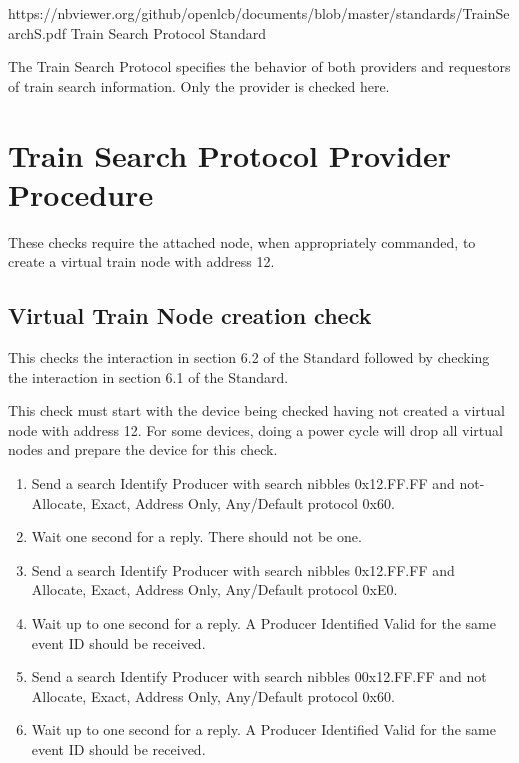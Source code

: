 



\maketitle
\thispagestyle{firststyle}

\introductionCaveats
    {https://nbviewer.org/github/openlcb/documents/blob/master/standards/TrainSearchS.pdf}
    {Train Search Protocol Standard}

The Train Search Protocol specifies the behavior of both providers and requestors of 
train search information.  Only the provider is checked here.


\section{Train Search Protocol Provider Procedure}


These checks require the attached node, when appropriately commanded,
to create a virtual train node with address 12.

\subsection{Virtual Train Node creation check}

This checks the interaction in section 6.2 of the Standard
followed by checking the interaction in section 6.1 of the Standard.

This check must start with the device being checked having not created a
virtual node with address 12. For some devices, doing a power cycle will 
drop all virtual nodes and prepare the device for this check.

\begin{enumerate}

\item Send a search Identify Producer with search nibbles 0x12.FF.FF and 
    not-Allocate, Exact, Address Only, Any/Default protocol 0x60.
    
\item Wait one second for a reply.  There should not be one.

\item Send a search Identify Producer with search nibbles 0x12.FF.FF and 
    Allocate, Exact, Address Only, Any/Default protocol 0xE0.

\item Wait up to one second for a reply.  A Producer Identified Valid for the same event ID
    should be received.

\item Send a search Identify Producer with search nibbles 00x12.FF.FF and 
    not Allocate, Exact, Address Only, Any/Default protocol 0x60.

\item Wait up to one second for a reply.  A Producer Identified Valid for the same event ID
    should be received.    

\end{enumerate}

